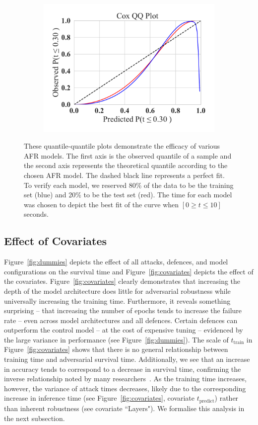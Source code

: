 \begin{figure}
\begin{subfigure}
	\end{subfigure}
	~
	\begin{subfigure}
		\centering
		\includegraphics[width=.30\textwidth,trim={20pt 20pt 20pt 20pt},clip]{plots/cox_qq.pdf}
	\end{subfigure}
	\caption{These quantile-quantile plots demonstrate the efficacy of various AFR models. The first axis is the observed quantile of a sample and the second axis represents the theoretical quantile according to the chosen AFR model. The dashed black line represents a perfect fit. To verify each model, we reserved 80\% of the data to be the training set (blue) and 20\% to be the test set (red). The time for each model was chosen to depict the best fit of the curve when $ [ 0 \geq t \leq 10 ] $ seconds.
 }
	\label{fig:afr_models}
\end{figure}

\subsection{Effect of Covariates}
Figure~\ref{fig:dummies} depicts the effect of all attacks, defences, and model configurations on the survival time and Figure~\ref{fig:covariates} depicts the effect of the covariates.
Figure~\ref{fig:covariates} clearly demonstrates that increasing the depth of the model architecture does little for adversarial robustness while universally increasing the training time.
Furthermore, it reveals something surprising -- that increasing the number of epochs tends to increase the failure rate -- even across model architectures and all defences.
Certain defences can outperform the control model -- at the cost of expensive tuning -- evidenced by the large variance in performance (see Figure~\ref{fig:dummies}). The scale of $t_{\mathrm{train}}$  in Figure~\ref{fig:covariates} shows that there is no general relationship between training time and adversarial survival time. Additionally, we see that an increase in accuracy tends to correspond to a decrease in survival time, confirming the inverse relationship noted by many researchers~\cite{carlini_towards_2017,biggio_evasion_2013,croce_reliable_2020}.
As the training time increases, however, the variance of attack times decreases, likely due to the corresponding increase in inference time (see Figure~\ref{fig:covariates}, covariate $t_{\mathrm{predict}}$) rather than inherent robustness (see covariate ``Layers").
We formalise this analysis in the next subsection.

